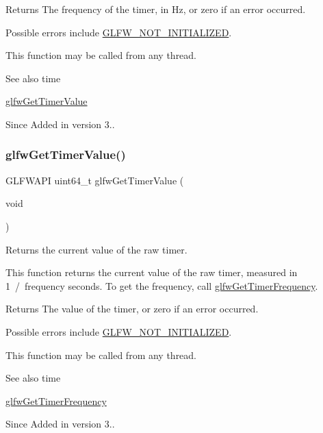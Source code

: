 \begin{DoxyReturn}{Returns}
The frequency of the timer, in Hz, or zero if an error occurred.
\end{DoxyReturn}
Possible errors include \hyperlink{group__errors_ga2374ee02c177f12e1fa76ff3ed15e14a}{G\+L\+F\+W\+\_\+\+N\+O\+T\+\_\+\+I\+N\+I\+T\+I\+A\+L\+I\+Z\+ED}.

This function may be called from any thread.

\begin{DoxySeeAlso}{See also}
time 

\hyperlink{group__input_gaa00c3e32227eb70b3968fca0bfe4ae26}{glfw\+Get\+Timer\+Value}
\end{DoxySeeAlso}
\begin{DoxySince}{Since}
Added in version 3.. 
\end{DoxySince}
\mbox{\label{group__input_gaa00c3e32227eb70b3968fca0bfe4ae26}} 
\subsubsection{\texorpdfstring{glfw\+Get\+Timer\+Value()}{glfwGetTimerValue()}}
{\footnotesize\ttfamily G\+L\+F\+W\+A\+PI uint64\+\_\+t glfw\+Get\+Timer\+Value (\begin{DoxyParamCaption}\item[{void}]{ }\end{DoxyParamCaption})}



Returns the current value of the raw timer. 

This function returns the current value of the raw timer, measured in 1~/~frequency seconds. To get the frequency, call \hyperlink{group__input_gaa92d10b10013372778efbf6367714371}{glfw\+Get\+Timer\+Frequency}.

\begin{DoxyReturn}{Returns}
The value of the timer, or zero if an error occurred.
\end{DoxyReturn}
Possible errors include \hyperlink{group__errors_ga2374ee02c177f12e1fa76ff3ed15e14a}{G\+L\+F\+W\+\_\+\+N\+O\+T\+\_\+\+I\+N\+I\+T\+I\+A\+L\+I\+Z\+ED}.

This function may be called from any thread.

\begin{DoxySeeAlso}{See also}
time 

\hyperlink{group__input_gaa92d10b10013372778efbf6367714371}{glfw\+Get\+Timer\+Frequency}
\end{DoxySeeAlso}
\begin{DoxySince}{Since}
Added in version 3.. 
\end{DoxySince}
\mbox{\label{group__input_ga7f81f22f355f4b7d315caf73cdfd9906}} 
